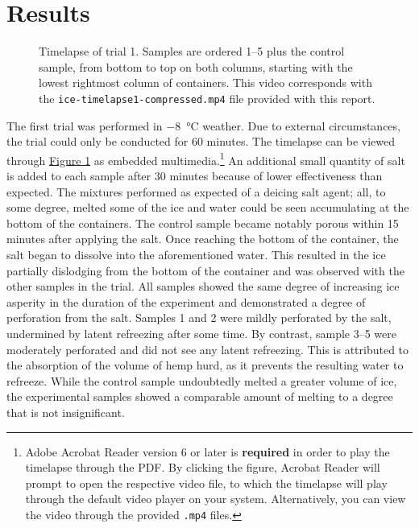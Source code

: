 \section*{Results}

\begin{figure}[t]
  \centering
  \label{mov:trial1}
  \caption{\small Timelapse of trial 1. Samples are ordered 1--5 plus the control sample, from bottom to top on both columns, starting with the lowest rightmost column of containers. This video corresponds with the \texttt{ice-timelapse1-compressed.mp4} file provided with this report.}
\end{figure}
The first trial was performed in \SI{-8}{\degreeCelsius} weather.
Due to external circumstances, the trial could only be conducted for 60 minutes.
The timelapse can be viewed through \hyperref[mov:trial1]{Figure 1} as embedded multimedia.\footnote[1]{Adobe Acrobat Reader version 6 or later is \textbf{required} in order to play the timelapse through the PDF. By clicking the figure, Acrobat Reader will prompt to open the respective video file, to which the timelapse will play through the default video player on your system. Alternatively, you can view the video through the provided \texttt{.mp4} files.}
An additional small quantity of salt is added to each sample after 30 minutes because of lower effectiveness than expected.
The mixtures performed as expected of a deicing salt agent; all, to some degree, melted some of the ice and water could be seen accumulating at the bottom of the containers.
The control sample became notably porous within 15 minutes after applying the salt.
Once reaching the bottom of the container, the salt began to dissolve into the aforementioned water.
This resulted in the ice partially dislodging from the bottom of the container and was observed with the other samples in the trial.
All samples showed the same degree of increasing ice asperity in the duration of the experiment and demonstrated a degree of perforation from the salt.
Samples 1 and 2 were mildly perforated by the salt, undermined by latent refreezing after some time.
By contrast, sample 3--5 were moderately perforated and did not see any latent refreezing.
This is attributed to the absorption of the volume of hemp hurd, as it prevents the resulting water to refreeze.
While the control sample undoubtedly melted a greater volume of ice, the experimental samples showed a comparable amount of melting to a degree that is not insignificant.

